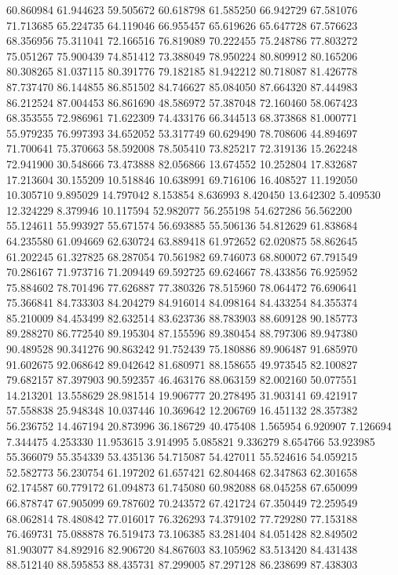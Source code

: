60.860984
61.944623
59.505672
60.618798
61.585250
66.942729
67.581076
71.713685
65.224735
64.119046
66.955457
65.619626
65.647728
67.576623
68.356956
75.311041
72.166516
76.819089
70.222455
75.248786
77.803272
75.051267
75.900439
74.851412
73.388049
78.950224
80.809912
80.165206
80.308265
81.037115
80.391776
79.182185
81.942212
80.718087
81.426778
87.737470
86.144855
86.851502
84.746627
85.084050
87.664320
87.444983
86.212524
87.004453
86.861690
48.586972
57.387048
72.160460
58.067423
68.353555
72.986961
71.622309
74.433176
66.344513
68.373868
81.000771
55.979235
76.997393
34.652052
53.317749
60.629490
78.708606
44.894697
71.700641
75.370663
58.592008
78.505410
73.825217
72.319136
15.262248
72.941900
30.548666
73.473888
82.056866
13.674552
10.252804
17.832687
17.213604
30.155209
10.518846
10.638991
69.716106
16.408527
11.192050
10.305710
9.895029
14.797042
8.153854
8.636993
8.420450
13.642302
5.409530
12.324229
8.379946
10.117594
52.982077
56.255198
54.627286
56.562200
55.124611
55.993927
55.671574
56.693885
55.506136
54.812629
61.838684
64.235580
61.094669
62.630724
63.889418
61.972652
62.020875
58.862645
61.202245
61.327825
68.287054
70.561982
69.746073
68.800072
67.791549
70.286167
71.973716
71.209449
69.592725
69.624667
78.433856
76.925952
75.884602
78.701496
77.626887
77.380326
78.515960
78.064472
76.690641
75.366841
84.733303
84.204279
84.916014
84.098164
84.433254
84.355374
85.210009
84.453499
82.632514
83.623736
88.783903
88.609128
90.185773
89.288270
86.772540
89.195304
87.155596
89.380454
88.797306
89.947380
90.489528
90.341276
90.863242
91.752439
75.180886
89.906487
91.685970
91.602675
92.068642
89.042642
81.680971
88.158655
49.973545
82.100827
79.682157
87.397903
90.592357
46.463176
88.063159
82.002160
50.077551
14.213201
13.558629
28.981514
19.906777
20.278495
31.903141
69.421917
57.558838
25.948348
10.037446
10.369642
12.206769
16.451132
28.357382
56.236752
14.467194
20.873996
36.186729
40.475408
1.565954
6.920907
7.126694
7.344475
4.253330
11.953615
3.914995
5.085821
9.336279
8.654766
53.923985
55.366079
55.354339
53.435136
54.715087
54.427011
55.524616
54.059215
52.582773
56.230754
61.197202
61.657421
62.804468
62.347863
62.301658
62.174587
60.779172
61.094873
61.745080
60.982088
68.045258
67.650099
66.878747
67.905099
69.787602
70.243572
67.421724
67.350449
72.259549
68.062814
78.480842
77.016017
76.326293
74.379102
77.729280
77.153188
76.469731
75.088878
76.519473
73.106385
83.281404
84.051428
82.849502
81.903077
84.892916
82.906720
84.867603
83.105962
83.513420
84.431438
88.512140
88.595853
88.435731
87.299005
87.297128
86.238699
87.438303
